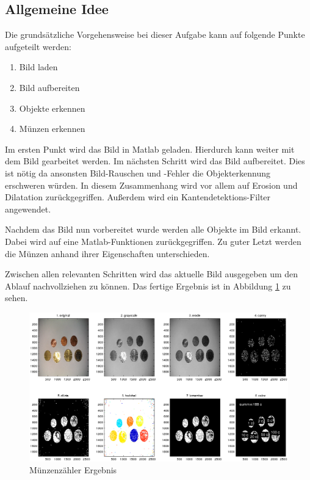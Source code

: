 \documentclass[a4paper,DIV=calc,ngerman]{scrartcl}
\begin{document}
\subsection{Allgemeine Idee}
\label{sec:a1idee}
Die grundsätzliche Vorgehensweise bei dieser Aufgabe kann auf folgende Punkte aufgeteilt werden:

\begin{enumerate}
    \item Bild laden
    \item Bild aufbereiten
    \item Objekte erkennen
    \item Münzen erkennen
\end{enumerate}

Im ersten Punkt wird das Bild in Matlab geladen. Hierdurch kann weiter mit dem Bild gearbeitet werden. Im nächsten Schritt wird das Bild aufbereitet. Dies ist nötig da ansonsten Bild-Rauschen und -Fehler die Objekterkennung erschweren würden. In diesem Zusammenhang wird vor allem auf Erosion und Dilatation zurückgegriffen. Außerdem wird ein Kantendetektions-Filter angewendet.

Nachdem das Bild nun vorbereitet wurde werden alle Objekte im Bild erkannt. Dabei wird auf eine Matlab-Funktionen zurückgegriffen. Zu guter Letzt werden die Münzen anhand ihrer Eigenschaften unterschieden.

Zwischen allen relevanten Schritten wird das aktuelle Bild ausgegeben um den Ablauf nachvollziehen zu können. Das fertige Ergebnis ist in Abbildung \ref{fig:coincountresult} zu sehen.


\begin{figure}
\centering
\includegraphics[width=13cm]{coin_count_result2}
\caption{Münzenzähler Ergebnis}
\label{fig:coincountresult}
\end{figure}
\end{document}
